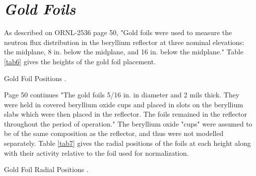 \documentclass[ms,a4paper]{memoir}
\begin{document}
\section{\emph{Gold Foils}}

As described on ORNL-2536 page 50, "Gold foils were used to measure the neutron flux distribution in the beryllium reflector at three nominal elevations: the midplane, 8 in. below the midplane, and 16 in. below the midplane." Table \ref{tab6} gives the heights of the gold foil placement.

\begin{table}[H]
  \centering
  \caption{Gold Foil Positions \parencite[Table 17]{ornl-2536}.}
  \label{tab6}
\end{table}

Page 50 continues "The gold foils 5/16 in. in diameter and 2 mils thick. They were held in covered beryllium oxide cups and placed in slots on the beryllium slabs which were then placed in the reflector. The foils remained in the reflector throughout the period of operation." The beryllium  oxide "cups" were assumed to be of the same composition as the reflector, and thus were not modelled separately. Table \ref{tab7} gives the radial positions of the foils at each height along with their activity relative to the foil used for normalization.

\begin{table}[H]
  \centering
  \caption{Gold Foil Radial Positions \parencite[Table 18]{ornl-2536}.}
  \label{tab7}
\end{table}

\printbibliography
\end{document}
